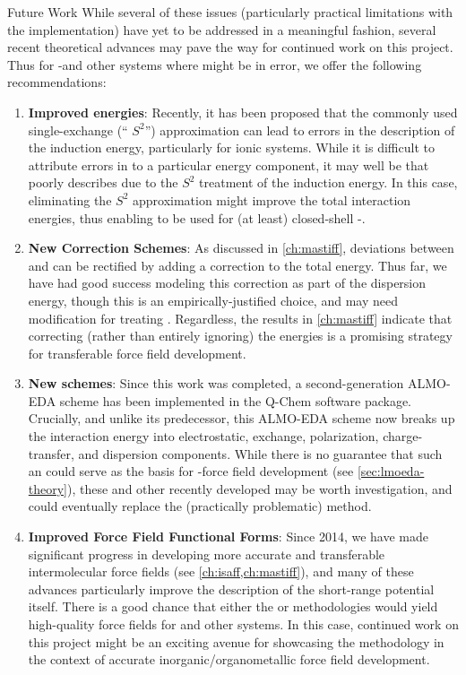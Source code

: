 \begin{section}{Future Work}
While several of these issues (particularly practical limitations with the
\lmoeda implementation) have yet to be addressed in a meaningful fashion,
several recent theoretical advances may pave the way for continued work on this
project. Thus for \cus-\mofs and other systems where \dftsapt might be in
error, we offer the following recommendations:
%
\begin{enumerate}
%
\item \textbf{Improved \sapt energies}: 
%
Recently, it has been proposed that the commonly used single-exchange (``
$S^2$'')
approximation can lead to errors in the description of the induction
energy,\cite{Jansen2012} particularly for ionic systems.\cite{Lao2015a} 
While it is difficult to attribute errors in \sapt to a particular energy
component, it may well be that \sapt poorly describes \mgmof due to the $S^2$
treatment of the induction energy. In this case, eliminating the $S^2$
approximation might improve the \dftsapt total interaction energies, thus
enabling \sapt to be used for (at least) closed-shell \cus-\mofs.
%
\item \textbf{New \sapt Correction Schemes}: 
%
As discussed in \cref{ch:mastiff}, deviations between \sapt and \ccsdt can be
rectified by adding a \dccsdt correction to the total \sapt energy.
Thus far, we have had good success modeling this \dccsdt correction as part of
the dispersion energy, though this is an empirically-justified choice, and may
need modification for treating \mgmof. Regardless, the results in
\cref{ch:mastiff}
indicate that correcting (rather than entirely ignoring) the \dftsapt energies
is a promising strategy for transferable force field development.
%
\item \textbf{New \eda schemes}: 
%
Since this work was completed, a second-generation ALMO-EDA scheme has been
implemented in the Q-Chem software package.\cite{Horn2016b} Crucially, and unlike its
predecessor, this ALMO-EDA scheme now breaks up the interaction energy into
electrostatic, exchange, polarization, charge-transfer, and dispersion
components. While there is no guarantee that such an \eda could serve as the
basis for \cus-\mof force field development (see \cref{sec:lmoeda-theory}),
these and other recently developed \edas may be worth investigation, and could
eventually replace the (practically problematic) \lmoeda method.
%
\item \textbf{Improved Force Field Functional Forms}: 
%
Since 2014, we have made significant progress in developing more accurate and
transferable intermolecular force fields (see \cref{ch:isaff,ch:mastiff}), and
many of these advances particularly improve the description of the short-range
potential itself. There is a good chance that either the \isaffold or \mastiff
methodologies would yield high-quality force fields for \mgmof and other
systems. In this case, continued work on this project might be an exciting
avenue for showcasing the \mastiff methodology in the context of
accurate inorganic/organometallic force field development.
%
\end{enumerate}



\end{section}

